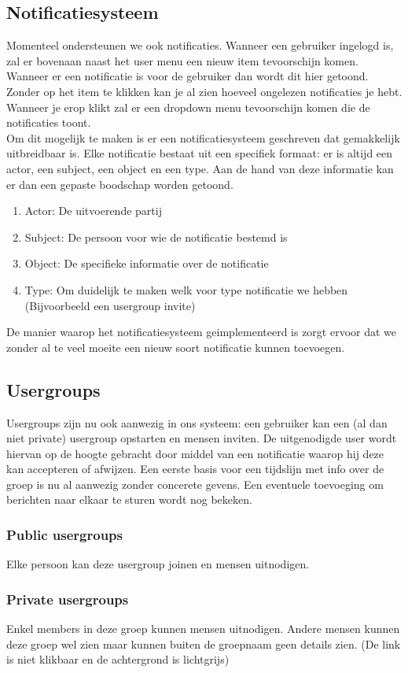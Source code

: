 \documentclass[11pt, a4paper]{article}
\begin{document}
\subsection{Notificatiesysteem}
Momenteel ondersteunen we ook notificaties. Wanneer een gebruiker ingelogd is, zal er bovenaan naast het user menu een nieuw item tevoorschijn komen. Wanneer er een notificatie is voor de gebruiker dan wordt dit hier getoond. Zonder op het item te klikken kan je al zien hoeveel ongelezen notificaties je hebt. Wanneer je erop klikt zal er een dropdown menu tevoorschijn komen die de notificaties toont. \\ 
Om dit mogelijk te maken is er een notificatiesysteem geschreven dat gemakkelijk uitbreidbaar is. Elke notificatie bestaat uit een specifiek formaat: er is altijd een actor, een subject, een object en een type. Aan de hand van deze informatie kan er dan een gepaste boodschap worden getoond. 
\begin{enumerate}
\item Actor: De uitvoerende partij
\item Subject: De persoon voor wie de notificatie bestemd is
\item Object: De specifieke informatie over de notificatie
\item Type: Om duidelijk te maken welk voor type notificatie we hebben (Bijvoorbeeld een usergroup invite)
\end{enumerate}
De manier waarop het notificatiesysteem geimplementeerd is zorgt ervoor dat we zonder al te veel moeite een nieuw soort notificatie kunnen toevoegen.

\subsection{Usergroups}
Usergroups zijn nu ook aanwezig in ons systeem: een gebruiker kan een (al dan niet private) usergroup opstarten en mensen inviten. De uitgenodigde user wordt hiervan op de hoogte gebracht door middel van een notificatie waarop hij deze kan accepteren of afwijzen. Een eerste basis voor een tijdslijn met info over de groep is nu al aanwezig zonder concerete gevens. Een eventuele toevoeging om berichten naar elkaar te sturen wordt nog bekeken.
\subsubsection{Public usergroups}
Elke persoon kan deze usergroup joinen en mensen uitnodigen.
\subsubsection{Private usergroups}
Enkel members in deze groep kunnen mensen uitnodigen. Andere mensen kunnen deze groep wel zien maar kunnen buiten de groepnaam geen details zien. (De link is niet klikbaar en de achtergrond is lichtgrijs)
\end{document}
